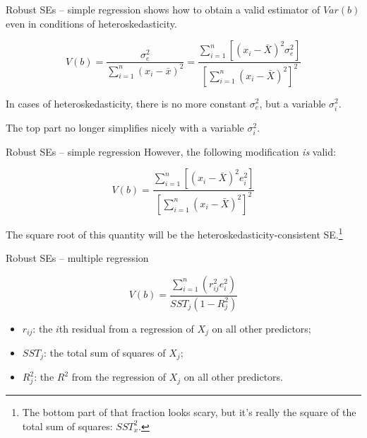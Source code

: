 \documentclass[12pt,english,pdf,xcolor=dvipsnames,aspectratio=169,handout]{beamer}\usepackage[]{graphicx}\usepackage[]{xcolor}
\begin{document}
\begin{frame}{Robust SEs -- simple regression}
   shows how to obtain a valid estimator of $Var(b)$ even in conditions of heteroskedasticity.\bigskip

  \begin{equation}
V(b) = \frac{\sigma_e^2}{\sum_{i=1}^n(x_i - \bar{x})^2} = \frac{\sum_{i=1}^n[(x_i-\bar{X})^2\sigma_e^2]}{[\sum_{i=1}^n(x_i-\bar{X})^2]^2}
\end{equation}

In cases of heteroskedasticity, there is no more constant $\sigma_e^2$, but a variable $\sigma_i^2$.

The top part no longer simplifies nicely with a variable $\sigma_i^2$.

\end{frame}


\begin{frame}{Robust SEs -- simple regression}
  However, the following modification \textit{is} valid:

  \begin{equation}
V(b) = \frac{\sum_{i=1}^n[(x_i-\bar{X})^2e_i^2]}{[\sum_{i=1}^n(x_i-\bar{X})^2]^2}
\end{equation}

The square root of this quantity will be the heteroskedasticity-consistent SE.\footnote{The bottom part of that fraction looks scary, but it's really the square of the total sum of squares: $SST_x^2$.}

\end{frame}


\begin{frame}{Robust SEs -- multiple regression}

  \begin{equation}
V(b) = \frac{\sum_{i=1}^n(r_{ij}^2e_i^2)}{SST_j(1-R_j^2)}
\end{equation}

\begin{itemize}
\item $r_{ij}$: the $i$th residual from a regression of $X_j$ on all other predictors;
\item $SST_j$: the total sum of squares of $X_j$;
\item $R_j^2$: the $R^2$ from the regression of $X_j$ on all other predictors.
\end{itemize}

\end{frame}
\end{document}
